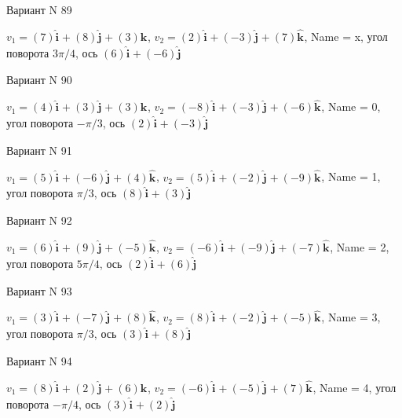 \documentclass[11pt]{report}
\begin{document}
Вариант N 89

$v_1 = \left(7\right)\mathbf{\hat{i}_{}} + \left(8\right)\mathbf{\hat{j}_{}} + \left(3\right)\mathbf{\hat{k}_{}}$, $v_2 = \left(2\right)\mathbf{\hat{i}_{}} + \left(-3\right)\mathbf{\hat{j}_{}} + \left(7\right)\mathbf{\hat{k}_{}}$, Name = x, угол поворота $3 \pi / 4$, ось $\left(6\right)\mathbf{\hat{i}_{}} + \left(-6\right)\mathbf{\hat{j}_{}}$

Вариант N 90

$v_1 = \left(4\right)\mathbf{\hat{i}_{}} + \left(3\right)\mathbf{\hat{j}_{}} + \left(3\right)\mathbf{\hat{k}_{}}$, $v_2 = \left(-8\right)\mathbf{\hat{i}_{}} + \left(-3\right)\mathbf{\hat{j}_{}} + \left(-6\right)\mathbf{\hat{k}_{}}$, Name = 0, угол поворота $- \pi / 3$, ось $\left(2\right)\mathbf{\hat{i}_{}} + \left(-3\right)\mathbf{\hat{j}_{}}$

Вариант N 91

$v_1 = \left(5\right)\mathbf{\hat{i}_{}} + \left(-6\right)\mathbf{\hat{j}_{}} + \left(4\right)\mathbf{\hat{k}_{}}$, $v_2 = \left(5\right)\mathbf{\hat{i}_{}} + \left(-2\right)\mathbf{\hat{j}_{}} + \left(-9\right)\mathbf{\hat{k}_{}}$, Name = 1, угол поворота $\pi / 3$, ось $\left(8\right)\mathbf{\hat{i}_{}} + \left(3\right)\mathbf{\hat{j}_{}}$

Вариант N 92

$v_1 = \left(6\right)\mathbf{\hat{i}_{}} + \left(9\right)\mathbf{\hat{j}_{}} + \left(-5\right)\mathbf{\hat{k}_{}}$, $v_2 = \left(-6\right)\mathbf{\hat{i}_{}} + \left(-9\right)\mathbf{\hat{j}_{}} + \left(-7\right)\mathbf{\hat{k}_{}}$, Name = 2, угол поворота $5 \pi / 4$, ось $\left(2\right)\mathbf{\hat{i}_{}} + \left(6\right)\mathbf{\hat{j}_{}}$

Вариант N 93

$v_1 = \left(3\right)\mathbf{\hat{i}_{}} + \left(-7\right)\mathbf{\hat{j}_{}} + \left(8\right)\mathbf{\hat{k}_{}}$, $v_2 = \left(8\right)\mathbf{\hat{i}_{}} + \left(-2\right)\mathbf{\hat{j}_{}} + \left(-5\right)\mathbf{\hat{k}_{}}$, Name = 3, угол поворота $\pi / 3$, ось $\left(3\right)\mathbf{\hat{i}_{}} + \left(8\right)\mathbf{\hat{j}_{}}$

Вариант N 94

$v_1 = \left(8\right)\mathbf{\hat{i}_{}} + \left(2\right)\mathbf{\hat{j}_{}} + \left(6\right)\mathbf{\hat{k}_{}}$, $v_2 = \left(-6\right)\mathbf{\hat{i}_{}} + \left(-5\right)\mathbf{\hat{j}_{}} + \left(7\right)\mathbf{\hat{k}_{}}$, Name = 4, угол поворота $- \pi / 4$, ось $\left(3\right)\mathbf{\hat{i}_{}} + \left(2\right)\mathbf{\hat{j}_{}}$
\end{document}
